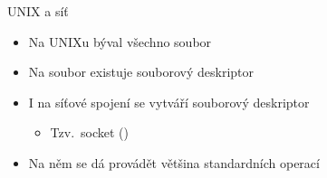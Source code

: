 
\begin{frame}{UNIX a síť}

  \begin{itemize}
    \item Na UNIXu býval všechno soubor

    \pause

    \item Na soubor existuje souborový deskriptor

    \pause

    \item I na síťové spojení se vytváří souborový deskriptor
    \begin{itemize}
      \item Tzv.\ socket ()
    \end{itemize}

    \pause

    \item Na něm se dá provádět většina standardních operací
  \end{itemize}

\end{frame}

